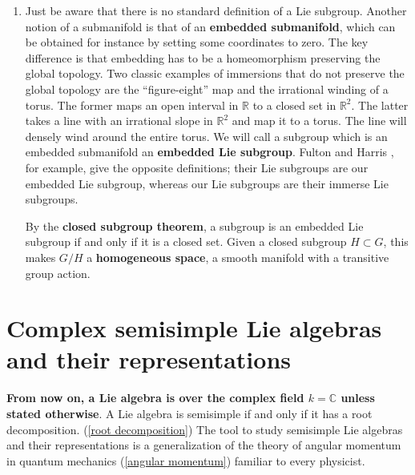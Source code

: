 \documentclass[aps,nofootinbib]{revtex4}
\begin{document}
\begin{enumerate}
\item Just be aware that there is no standard definition of a Lie subgroup.
Another notion of a submanifold is that of an \textbf{embedded submanifold},
which can be obtained for instance by setting some coordinates to
zero. The key difference is that embedding has to be a homeomorphism
preserving the global topology. Two classic examples of immersions
that do not preserve the global topology are the ``figure-eight''
map and the irrational winding of a torus. \cite{Lee12} The former maps an open
interval in $\mathbb{R}$ to a closed set in $\mathbb{R}^{2}$. The
latter takes a line with an irrational slope in $\mathbb{R}^{2}$
and map it to a torus. The line will densely wind around the entire
torus. We will call a subgroup which is an embedded submanifold an
\textbf{embedded Lie subgroup}. Fulton and Harris \cite{FH91}, for example, give
the opposite definitions; their Lie subgroups are our embedded Lie
subgroup, whereas our Lie subgroups are their immerse Lie subgroups.

By the \textbf{closed subgroup theorem}, a subgroup is an embedded
Lie subgroup if and only if it is a closed set. Given a closed subgroup
$H\subset G$, this makes $G/H$ a \textbf{homogeneous space}, a smooth
manifold with a transitive group action.

\end{enumerate}

\section{Complex semisimple Lie algebras and their representations}

{\bf From now on, a Lie algebra is over the complex field $k=\mathbb{C}$ unless stated otherwise}. A Lie algebra is semisimple if and only if it has a root decomposition. (\ref{root decomposition}) The tool to study semisimple Lie algebras and their representations is a generalization of the theory of angular momentum in quantum mechanics (\ref{angular momentum}) familiar to every physicist.
\end{document}
